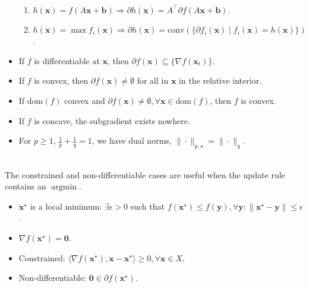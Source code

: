 \documentclass[8pt,a4paper]{extarticle}
\DeclareMathOperator*{\argmin}{argmin}
\renewcommand{\vec}[1]{\bm{#1}}
\newcommand{\mat}[1]{#1}
\newcommand{\transpose}[1]{#1^\top}
\newcommand{\dom}[1]{\mathrm{dom}(#1)}
\newenvironment{topic}[1]
{\textbf{\sffamily \colorbox{black}{\rlap{\textbf{\textcolor{white}{#1}}}\hspace{\linewidth}\hspace{-2\fboxsep}}} \\ \vspace{0.2cm}}
{}
\begin{document}
\begin{multicols*}{2}
\begin{topic}{Lemmas}
\begin{itemize}
\begin{enumerate}
                      \item $h(\vec{x}) = f(\mat{A} \vec{x} + \vec{b}) \Rightarrow \partial h(\vec{x}) = \transpose{\mat{A}} \partial f(\mat{A} \vec{x} + \vec{b})$.
                      \item $h(\vec{x}) = \max f_i(\vec{x}) \Rightarrow \partial h(\vec{x}) = \mathrm{conv}(\{ \partial f_i(\vec{x}) \mid f_i(\vec{x}) = h(\vec{x}) \})$.
                  \end{enumerate}
            \item If $f$ is differentiable at $\vec{x}$, then $\partial f(\vec{x}) \subseteq \{ \nabla f(\vec{x}_t)
                      \}$.
            \item If $f$ is convex, then $\partial f(\vec{x}) \neq \emptyset$ for all in $\vec{x}$ in the relative
                  interior.
            \item If $\dom{f}$ convex and $\partial f(\vec{x}) \neq \emptyset,\forall \vec{x} \in \dom{f}$, then $f$
                  is convex.
            \item If $f$ is concave, the subgradient exists nowhere.
            \item For $p \geq 1$, $\frac{1}{p} + \frac{1}{q} = 1$, we have dual norms, $\| \cdot \|_{p,\star} = \|
                      \cdot \|_q$.
        \end{itemize}
    \end{topic}

    \begin{topic}{Optimality lemmas (assume convexity)}
        The constrained and non-differentiable cases are useful when the update rule contains an $\argmin$.
        \begin{itemize}
            \item $\vec{x}^\star$ is a local minimum: $\exists \epsilon > 0$ such that $f(\vec{x}^\star) \leq f(\vec{y}), \forall \vec{y} : \| \vec{x}^\star - \vec{y} \| \leq \epsilon$.
            \item $\nabla f(\vec{x}^\star) = \vec{0}$.
            \item Constrained: $\langle \nabla f(\vec{x}^\star), \vec{x} - \vec{x}^\star \rangle \geq 0, \forall
                      \vec{x} \in X$.
            \item Non-differentiable: $\vec{0} \in \partial f(\vec{x}^\star)$.
        \end{itemize}
    \end{topic}


\end{multicols*}
\end{document}
